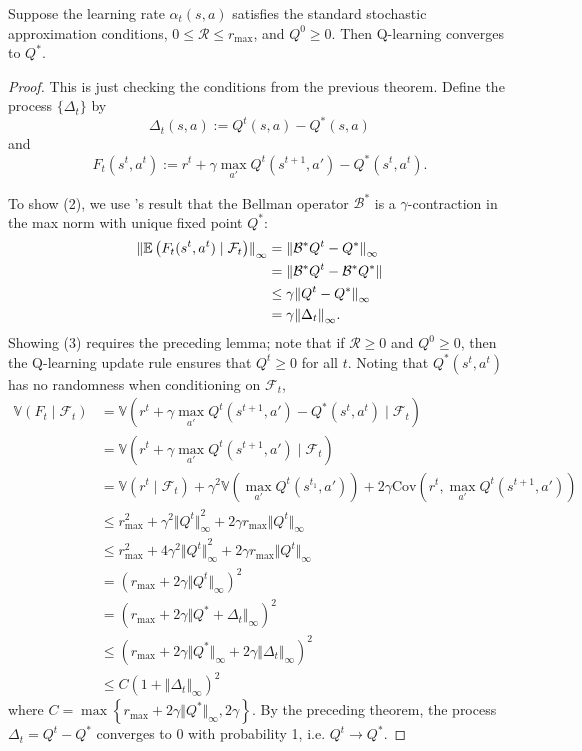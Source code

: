 \documentclass[twoside,10pt]{report}
\begin{document}
\begin{prop}
	Suppose the learning rate $\alpha_{t}(s,a)$ satisfies the standard stochastic approximation conditions, $0 \leq \mathcal{R} \leq r_{\text{max}}$, and $Q^{0} \geq 0$. Then Q-learning converges to $Q^{*}$.
\end{prop}
\begin{proof}
	This is just checking the conditions from the previous theorem. Define the process $\{\Delta_{t}\}$ by
	\[
	\Delta_{t}(s,a) := Q^{t}(s,a) - Q^{*}(s,a)
	\] and
	\[
	F_{t}(s^{t},a^{t}) := r^{t} + \gamma \max_{a'} Q^{t}(s^{t+1},a') - Q^{*}(s^{t},a^{t}).
	\] 

	To show (2), we use 's result that the Bellman operator $\mathcal{B}^{*}$ is a $\gamma$-contraction in the max norm with unique fixed point $Q^{*}$:
	\begin{align*}
		{\Vert{\mathbb{E} \left(  F_{t}(s^{t},a^{t}) \;|\; \mathcal{F}_{t} \right)}\Vert}_{\infty} &= {\Vert{\mathcal{B}^{*} Q^{t} - Q^{*}}\Vert}_{\infty} \\
										     &= {\Vert{\mathcal{B}^{*} Q^{t} - \mathcal{B}^{*} Q^{*}}\Vert} \\
										     &\leq \gamma {\Vert{Q^{t} - Q^{*}}\Vert}_{\infty} \\
										     &= \gamma {\Vert{\Delta_{t}}\Vert}_{\infty}.
	\end{align*}
	Showing (3) requires the preceding lemma; note that if $\mathcal{R} \geq 0$ and $Q^{0} \geq 0$, then the Q-learning update rule ensures that $Q^{t} \geq 0$ for all $t$. Noting that $Q^{*}(s^{t},a^{t})$ has no randomness when conditioning on $\mathcal{F}_{t}$,
	\begin{align*}
		\mathbb{V}(F_{t} \;|\; \mathcal{F}_{t}) &= \mathbb{V}(r^{t} + \gamma \max_{a'} Q^{t}(s^{t+1},a') - Q^{*}(s^{t},a^{t}) \;|\; \mathcal{F}_{t}) \\
		&= \mathbb{V}(r^{t} + \gamma \max_{a'} Q^{t}(s^{t+1},a') \;|\; \mathcal{F}_{t}) \\
		&= \mathbb{V}(r^{t} \;|\; \mathcal{F}_{t}) + \gamma^{2}\mathbb{V}(\max_{a'}Q^{t}(s^{t_1},a')) + 2\gamma \text{Cov}( r^{t}, \max_{a'}Q^{t}(s^{t+1},a')) \\
		&\leq r_{\text{max}}^2 + \gamma^{2} {\Vert{Q^{t}}\Vert}_\infty^2 + 2\gamma r_{\text{max}} {\Vert{Q^{t}}\Vert}_{\infty} \\
		&\leq r_{\text{max}}^2 + 4 \gamma^{2} {\Vert{Q^{t}}\Vert}_\infty^2 + 2\gamma r_{\text{max}} {\Vert{Q^{t}}\Vert}_{\infty} \\
		&= ( r_{\text{max}} + 2 \gamma {\Vert{Q^{t}}\Vert}_{\infty})^2 \\
		&= (r_{\text{max}} + 2 \gamma {\Vert{Q^{*} + \Delta_{t}}\Vert}_{\infty})^2 \\
		&\leq \left( r_{\text{max}} + 2\gamma {\Vert{Q^{*}}\Vert}_{\infty} + 2\gamma {\Vert{\Delta_{t}}\Vert}_{\infty} \right)^2 \\
		&\leq C (1 + {\Vert{\Delta_{t}}\Vert}_{\infty})^2
	\end{align*}
where $C = \max\left\{ r_{\text{max}} + 2 \gamma {\Vert{Q^{*}}\Vert}_{\infty}, 2 \gamma \right\}$. By the preceding theorem, the process $\Delta_{t} = Q^{t} - Q^{*}$ converges to 0 with probability 1, i.e. $Q^{t} \to Q^{*}$.
\end{proof}
\end{document}

